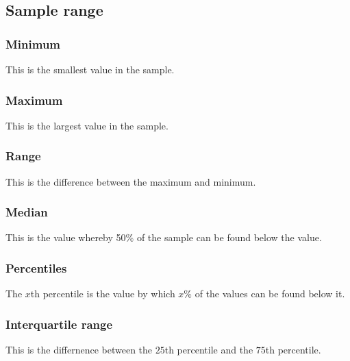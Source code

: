 
\subsection{Sample range}

\subsubsection{Minimum}

This is the smallest value in the sample.

\subsubsection{Maximum}

This is the largest value in the sample.

\subsubsection{Range}

This is the difference between the maximum and minimum.

\subsubsection{Median}

This is the value whereby 50\% of the sample can be found below the value.

\subsubsection{Percentiles}

The \(x\)th percentile is the value by which  \(x\%\) of the values can be found below it.

\subsubsection{Interquartile range}

This is the differnence between the \(25\)th percentile and the \(75\)th percentile.

